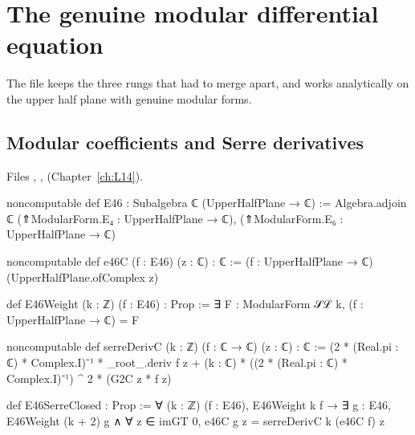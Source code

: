 \section{The genuine modular differential equation}\label{l16:sec:mlde}

The file  keeps the three rungs that  had to merge apart, and works
analytically on the upper half plane with genuine modular forms.

\subsection{Modular coefficients and Serre derivatives}

\noindent Files ,
,
 (Chapter~\ref{ch:L14}).
\begin{leancode}
noncomputable def E46 : Subalgebra ℂ (UpperHalfPlane → ℂ) :=
  Algebra.adjoin ℂ {(⇑ModularForm.E₄ : UpperHalfPlane → ℂ), (⇑ModularForm.E₆ : UpperHalfPlane → ℂ)}

noncomputable def e46C (f : E46) (z : ℂ) : ℂ :=
  (f : UpperHalfPlane → ℂ) (UpperHalfPlane.ofComplex z)

def E46Weight (k : ℤ) (f : E46) : Prop :=
  ∃ F : ModularForm 𝒮ℒ k, (f : UpperHalfPlane → ℂ) = F

noncomputable def serreDerivC (k : ℤ) (f : ℂ → ℂ) (z : ℂ) : ℂ :=
  (2 * (Real.pi : ℂ) * Complex.I)⁻¹ * _root_.deriv f z
    + (k : ℂ) * ((2 * (Real.pi : ℂ) * Complex.I)⁻¹) ^ 2 * (G2C z * f z)

def E46SerreClosed : Prop :=
  ∀ (k : ℤ) (f : E46), E46Weight k f →
    ∃ g : E46, E46Weight (k + 2) g ∧
      ∀ z ∈ imGT 0, e46C g z = serreDerivC k (e46C f) z
\end{leancode}


